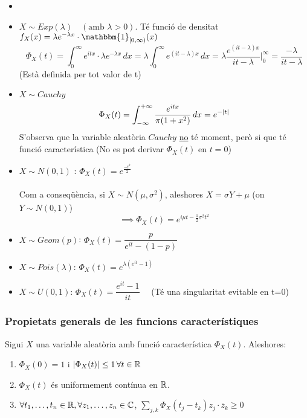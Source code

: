 \begin{example}
  \begin{itemize}
      \item[]
      \item $X\sim Exp(\lambda) \quad (\text{amb } \lambda > 0)$. Té funció de densitat $f_{X}(x) = \lambda e^{-\lambda x}\cdot \mathbbm{1}_{[0, \infty)}(x)$
      \[
        \Phi_{X}(t) = \int_{0}^{\infty}e^{itx}\cdot\lambda e^{-\lambda x} \, dx = \lambda\int_{0}^{\infty}e^{(it-\lambda)x} \, dx = \lambda\frac{e^{(it-\lambda)x}}{it-\lambda}\bigg|_{0}^{\infty} = \frac{-\lambda}{it-\lambda}
      \]
      (Està definida per tot valor de t)
      \item $X\sim Cauchy$
      \[
        \Phi_{X}(t) = \int_{-\infty}^{+\infty}\frac{e^{itx}}{\pi(1+x^{2})} \, dx = e^{-\left\vert t \right\vert}
      \]
      S'observa que la variable aleatòria $Cauchy$ \underline{no} té moment, però si que té funció característica (No es pot derivar $\Phi_{X}(t)$ en $t=0$)
      \item $X\sim N(0,1)$ : $\Phi_{X}(t) = e^{\frac{-t^{2}}{2}}$ \\\\
      Com a conseqüència, si $X\sim N(\mu, \sigma^{2})$, aleshores $X=\sigma Y + \mu$ (on $Y\sim N(0,1)$)
      \[
        \implies \Phi_{X}(t) = e^{i\mu t - \frac{1}{2}\sigma^{2}t^{2}}
      \]
      
      \item $X\sim Geom(p)$: $\Phi_{X}(t) = \dfrac{p}{e^{it}-(1-p)}$
      \item $X\sim Pois(\lambda)$: $\Phi_{X}(t) = e^{\lambda(e^{it}-1)}$
      \item $X\sim U(0,1)$: $\Phi_{X}(t) = \dfrac{e^{it}-1}{it} \quad$ (Té una singularitat evitable en t=0)
  \end{itemize}
\end{example}

\subsubsection{Propietats generals de les funcions característiques}
\begin{prop}
  Sigui $X$ una variable aleatòria amb funció característica $\Phi_{X}(t)$. Aleshores:
  \begin{enumerate}
      \item $\Phi_{X}(0)=1$ i $\left\vert \Phi_{X}(t) \right\vert\leq 1 \, \forall t\in\mathbb{R}$
      \item $\Phi_{X}(t)$ és uniformement contínua en $\mathbb{R}$.
      \item $\forall t_{1},\ldots,t_{n} \in \mathbb{R}, \forall z_{1},\ldots,z_{n}\in\mathbb{C}$, $\sum\limits_{j,k}\Phi_{X}(t_{j}-t_{k})z_{j}\cdot \overline{z}_{k}\geq0$
  \end{enumerate}
\end{prop}


